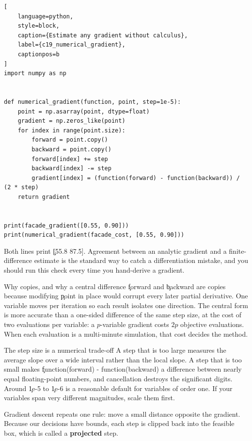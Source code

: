 \begin{lstlisting}[
    language=python,
    style=block,
    caption={Estimate any gradient without calculus},
    label={c19_numerical_gradient},
    captionpos=b
]
import numpy as np


def numerical_gradient(function, point, step=1e-5):
    point = np.asarray(point, dtype=float)
    gradient = np.zeros_like(point)
    for index in range(point.size):
        forward = point.copy()
        backward = point.copy()
        forward[index] += step
        backward[index] -= step
        gradient[index] = (function(forward) - function(backward)) / (2 * step)
    return gradient


print(facade_gradient([0.55, 0.90]))
print(numerical_gradient(facade_cost, [0.55, 0.90]))
\end{lstlisting}

Both lines print \c{[55.8 87.5]}. Agreement between an analytic gradient and a
finite-difference estimate is the standard way to catch a differentiation
mistake, and you should run this check every time you hand-derive a gradient.

\begin{SyntaxBox}{Why copies, and why a central difference}
\c{forward} and \c{backward} are copies because modifying \c{point} in place
would corrupt every later partial derivative. One variable moves per iteration
so each result isolates one direction. The central form is more accurate than a
one-sided difference of the same step size, at the cost of two evaluations per
variable: a $p$-variable gradient costs $2p$ objective evaluations. When each
evaluation is a multi-minute simulation, that cost decides the method.
\end{SyntaxBox}

\begin{ExplainBox}{The step size is a numerical trade-off}
A step that is too large measures the average slope over a wide interval rather
than the local slope. A step that is too small makes
\c{function(forward) - function(backward)} a difference between nearly equal
floating-point numbers, and cancellation destroys the significant digits.
Around \c{1e-5} to \c{1e-6} is a reasonable default for variables of order one.
If your variables span very different magnitudes, scale them first.
\end{ExplainBox}


Gradient descent repeats one rule: move a small distance opposite the gradient.
Because our decisions have bounds, each step is clipped back into the feasible
box, which is called a \textbf{projected} step.

